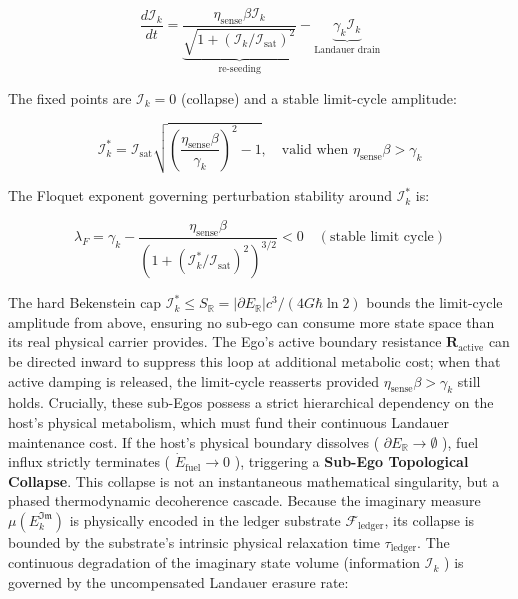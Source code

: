 \documentclass[11pt,a4paper]{article}
\theoremstyle{definition}
\theoremstyle{remark}
\begin{document}
\begin{equation}
\frac{d\mathcal{I}_k}{dt} = \underbrace{\frac{\eta_{\text{sense}} \beta \mathcal{I}_k}{\sqrt{1 + (\mathcal{I}_k/\mathcal{I}_{\text{sat}})^2}}}_{\text{re-seeding}} - \underbrace{\gamma_k \mathcal{I}_k}_{\text{Landauer drain}}
\end{equation}


The fixed points are $\mathcal{I}_k = 0$ (collapse) and a stable limit-cycle amplitude:


\begin{equation}
\boxed{\mathcal{I}_k^* = \mathcal{I}_{\text{sat}}\sqrt{\left(\frac{\eta_{\text{sense}} \beta}{\gamma_k}\right)^2 - 1}, \quad \text{valid when } \eta_{\text{sense}} \beta > \gamma_k}
\end{equation}


The Floquet exponent governing perturbation stability around $\mathcal{I}_k^*$ is:


\begin{equation}
\lambda_F = \gamma_k - \frac{\eta_{\text{sense}} \beta}{(1 + (\mathcal{I}_k^*/\mathcal{I}_{\text{sat}})^2)^{3/2}} < 0 \quad (\text{stable limit cycle})
\end{equation}


The hard Bekenstein cap $\mathcal{I}_k^* \leq S_{\mathbb{R}} = |\partial E_{\mathbb{R}}| c^3 / (4G\hbar \ln 2)$ bounds the limit-cycle amplitude from above, ensuring no sub-ego can consume more state space than its real physical carrier provides. The Ego's active boundary resistance $\mathbf{R}_{\text{active}}$ can be directed inward to suppress this loop at additional metabolic cost; when that active damping is released, the limit-cycle reasserts provided $\eta_{\text{sense}} \beta > \gamma_k$ still holds.
Crucially, these sub-Egos possess a strict hierarchical dependency on the host's physical metabolism, which must fund their continuous Landauer maintenance cost. If the host's physical boundary dissolves ( $\partial E_{\mathbb{R}} \to \emptyset$ ), fuel influx strictly terminates ( $\dot{E}_{\text{fuel}} \to 0$ ), triggering a \textbf{Sub-Ego Topological Collapse}. This collapse is not an instantaneous mathematical singularity, but a phased thermodynamic decoherence cascade. Because the imaginary measure $\mu(E_k^{\mathfrak{Im}})$ is physically encoded in the ledger substrate $\mathcal{F}_{\text{ledger}}$, its collapse is bounded by the substrate's intrinsic physical relaxation time $\tau_{\text{ledger}}$. The continuous degradation of the imaginary state volume (information $\mathcal{I}_k$ ) is governed by the uncompensated Landauer erasure rate:
\end{document}
